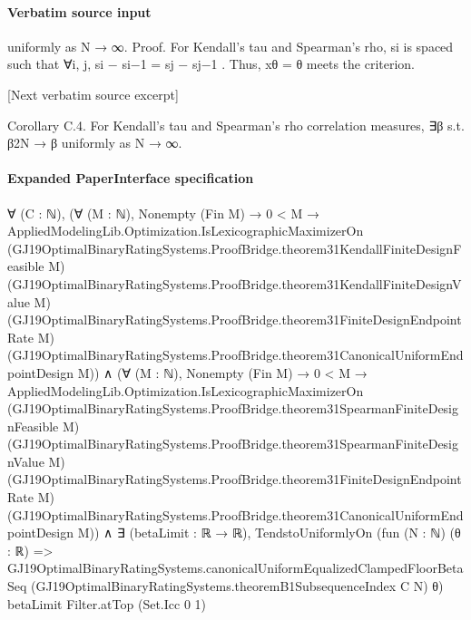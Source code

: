 \documentclass[10pt]{article}
\begin{document}
\paragraph{Verbatim source input}
\begin{ReviewVerbatim}
uniformly as N → ∞.
Proof. For Kendall’s tau and Spearman’s rho, {si } is spaced such that ∀i, j, si − si−1 = sj − sj−1 .
Thus, xθ = θ meets the criterion.


[Next verbatim source excerpt]

Corollary C.4. For Kendall’s tau and Spearman’s rho correlation measures, ∃β s.t. β2N → β
uniformly as N → ∞.
\end{ReviewVerbatim}



\paragraph{Expanded PaperInterface specification}
\begin{ReviewVerbatim}
∀ (C : ℕ),
  (∀ (M : ℕ),
      Nonempty (Fin M) →
        0 < M →
          AppliedModelingLib.Optimization.IsLexicographicMaximizerOn
            (GJ19OptimalBinaryRatingSystems.ProofBridge.theorem31KendallFiniteDesignFeasible M)
            (GJ19OptimalBinaryRatingSystems.ProofBridge.theorem31KendallFiniteDesignValue M)
            (GJ19OptimalBinaryRatingSystems.ProofBridge.theorem31FiniteDesignEndpointRate M)
            (GJ19OptimalBinaryRatingSystems.ProofBridge.theorem31CanonicalUniformEndpointDesign M)) ∧
    (∀ (M : ℕ),
        Nonempty (Fin M) →
          0 < M →
            AppliedModelingLib.Optimization.IsLexicographicMaximizerOn
              (GJ19OptimalBinaryRatingSystems.ProofBridge.theorem31SpearmanFiniteDesignFeasible M)
              (GJ19OptimalBinaryRatingSystems.ProofBridge.theorem31SpearmanFiniteDesignValue M)
              (GJ19OptimalBinaryRatingSystems.ProofBridge.theorem31FiniteDesignEndpointRate M)
              (GJ19OptimalBinaryRatingSystems.ProofBridge.theorem31CanonicalUniformEndpointDesign M)) ∧
      ∃ (betaLimit : ℝ → ℝ),
        TendstoUniformlyOn
          (fun (N : ℕ) (θ : ℝ) =>
            GJ19OptimalBinaryRatingSystems.canonicalUniformEqualizedClampedFloorBetaSeq
              (GJ19OptimalBinaryRatingSystems.theoremB1SubsequenceIndex C N) θ)
          betaLimit Filter.atTop (Set.Icc 0 1)
\end{ReviewVerbatim}
\end{document}
